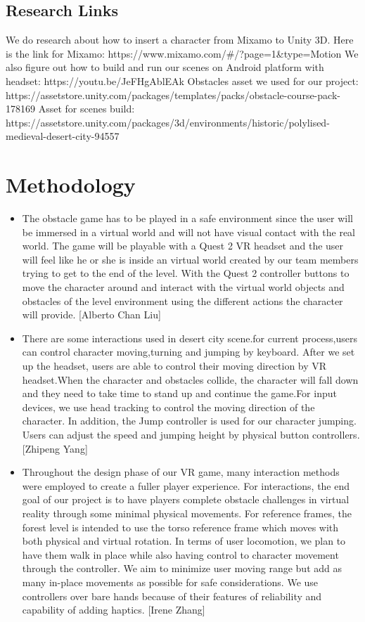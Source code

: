 \documentclass{vgtc}                          %
\begin{document}
\subsection{Research Links}
We do research about how to insert a character from Mixamo to Unity 3D. Here is the link for Mixamo: https://www.mixamo.com/#/?page=1&type=Motion%
We also figure out how to build and run our scenes on Android platform with headset: https://youtu.be/JeFHgAblEAk
Obstacles asset we used for our project: https://assetstore.unity.com/packages/templates/packs/obstacle-course-pack-178169
Asset for scenes build: https://assetstore.unity.com/packages/3d/environments/historic/polylised-medieval-desert-city-94557

\section{Methodology}

\begin{itemize}
\item The obstacle game has to be played in a safe environment since the user will be immersed in a virtual world and will not have visual contact with the real world. The game will be playable with a Quest 2 VR headset and the user will feel like he or she is inside an virtual world created by our team members trying to get to the end of the level. With the Quest 2 controller buttons to move the character around and interact with the virtual world objects and obstacles  of the level environment using the different actions the character will provide. [Alberto Chan Liu]
\item There are some interactions used in desert city scene.for current process,users can control character moving,turning and jumping by keyboard. After we set up the headset, users are able to control their moving direction by VR headset.When the character and obstacles collide, the character will fall down and they need to take time to stand up and continue the game.For input devices, we use head tracking to control the moving direction of the character. In addition, the Jump controller is used for our character jumping. Users can adjust the speed and jumping height by physical button controllers.[Zhipeng Yang] 
\item Throughout the design phase of our VR game, many interaction methods were employed to create a fuller player experience. For interactions, the end goal of our project is to have players complete obstacle challenges in virtual reality through some minimal physical movements. For reference frames, the forest level is intended to use the torso reference frame which moves with both physical and virtual rotation. In terms of user locomotion, we plan to have them walk in place while also having control to character movement through the controller. We aim to minimize user moving range but add as many in-place movements as possible for safe considerations. We use controllers over bare hands because of their features of reliability and capability of adding haptics. [Irene Zhang]

\end{itemize}
\end{document}
